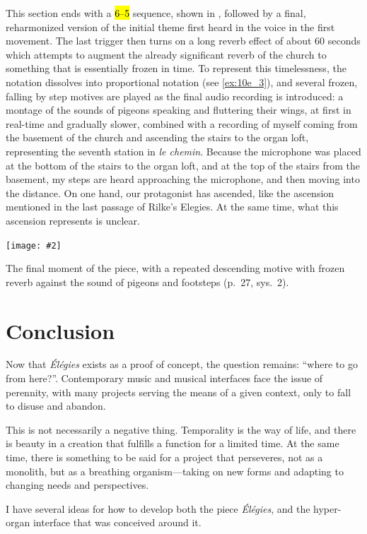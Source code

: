 \documentclass[12pt,twoside,maitrise]{dms_ks}
\newcommand{\customincludeexamples}[4][]{%
    \begin{example}[H]
        \centering
        \texttt{[image: \#2]}
        \caption{#4}
	\label{#3} 
    \end{example}
}
\theoremstyle{definition}
\begin{document}
{{This section ends with a \hl{6--5} sequence, shown in , followed by a final, reharmonized version of the initial theme first heard in the voice in the first movement. 
The last trigger then turns on a long reverb effect of about 60 seconds which attempts to augment the already significant reverb of the church to something that is essentially frozen in time. 
To represent this timelessness, the notation dissolves into proportional notation (see \cref{ex:10e_3}), and several frozen, falling by step motives are played as the final audio recording is introduced: a montage of the sounds of pigeons speaking and fluttering their wings, at first in real-time and gradually slower, combined with a recording of myself coming from the basement of the church and ascending the stairs to the organ loft, representing the seventh station in \textit{le chemin}. 
Because the microphone was placed at the bottom of the stairs to the organ loft, and at the top of the stairs from the basement, my steps are heard approaching the microphone, and then moving into the distance. 
On one hand, our protagonist has ascended, like the ascension mentioned in the last passage of Rilke's Elegies. 
At the same time, what this ascension represents is unclear.

\customincludeexamples[width=\textwidth]{10e_3}{ex:10e_3}{The final moment of the piece, with a repeated descending motive with frozen reverb against the sound of pigeons and footsteps (p.~27, sys.~2).}

\chapter*{Conclusion}

Now that \textit{Élégies} exists as a proof of concept, the question remains: “where to go from here?”.
Contemporary music and musical interfaces face the issue of perennity, with many projects serving the means of a given context, only to fall to disuse and abandon. 

This is not necessarily a negative thing.
Temporality is the way of life, and there is beauty in a creation that fulfills a function for a limited time.
At the same time, there is something to be said for a project that perseveres, not as a monolith, but as a breathing organism---taking on new forms and adapting to changing needs and perspectives.   

I have several ideas for how to develop both the piece \textit{Élégies}, and the hyper-organ interface that was conceived around it. 

}}
\end{document}
